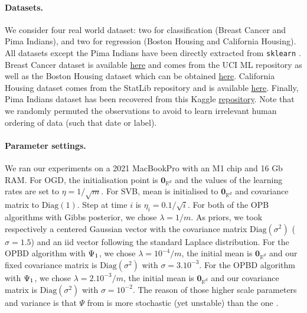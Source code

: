 \paragraph{Datasets.} We consider four real world dataset: two for classification (Breast Cancer and Pima Indians), and two for regression (Boston Housing and California Housing). All datasets except the Pima Indians have been directly extracted from \texttt{sklearn} \citep{pedregosa2011scikit}.
Breast Cancer dataset \citep{street1993nuclear} is available \href{https://archive.ics.uci.edu/ml/datasets/Breast+Cancer+Wisconsin+(Diagnostic)}{here} and comes from the UCI ML repository  as well as the Boston Housing dataset \citep{belsley2005regression} which can be obtained \href{https://archive.ics.uci.edu/ml/machine-learning-databases/housing/}{here}. California Housing dataset \citep{pace1997sparse} comes from the StatLib repository and is available \href{https://www.dcc.fc.up.pt/~ltorgo/Regression/cal_housing.html}{here}.
Finally, Pima Indians dataset \citep{smith1988using} has been recovered from this Kaggle \href{https://www.kaggle.com/datasets/uciml/pima-indians-diabetes-database}{repository}.  Note that we randomly permuted the observations to avoid to learn irrelevant human ordering of data (such that date or label).

\paragraph{Parameter settings.}
 We ran our experiments on a 2021 MacBookPro with an M1 chip and 16 Gb RAM.
 For OGD, the initialisation point is $\mathbf{0}_{\mathbb{R}^d}$ and the values of the learning rates are set to $\eta=1 / \sqrt{m}$.
 For SVB, mean is initialised to $\mathbf{0}_{\mathbb{R}^d}$ and covariance matrix to $\text{Diag}(1)$. Step at time $i$ is $\eta_i= 0.1/\sqrt{i}$.
 For both of the OPB algorithms with Gibbs posterior, we chose $\lambda= 1/m$. As priors, we took respectively a centered Gaussian vector with the covariance matrix $\text{Diag}(\sigma^2)$ ($\sigma=1.5$) and an iid vector following the standard Laplace distribution.
 For the OPBD algorithm with $\Psi_{\normalfont1}$, we chose $\lambda = 10^{-4}/m$, the initial mean is $\mathbf{0}_{\mathbb{R}^d}$ and
 our fixed covariance matrix is $\text{Diag}(\sigma^2)$ with $\sigma= 3.10^{-3}$.
 For the OPBD algorithm with $\Psi_{\normalfont1}$, we chose $\lambda = 2.10^{-3}/m$, the initial mean is $\mathbf{0}_{\mathbb{R}^d}$ and our covariance matrix is $\text{Diag}(\sigma^2)$ with $\sigma= 10^{-2}$.  The reason of those higher scale parameters and variance is that  $\Psi$ from \citet{rivasplata2020pac} is more stochastic (yet unstable) than the one \citet{viallard2023general}.

